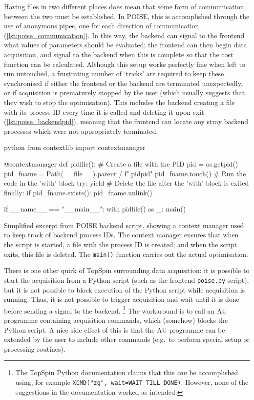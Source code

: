 Having files in two different places does mean that some form of communication between the two must be established.
In POISE, this is accomplished through the use of anonymous pipes, one for each direction of communication (\cref{lst:poise_communication}).
In this way, the backend can signal to the frontend what values of parameters should be evaluated; the frontend can then begin data acquisition, and signal to the backend when this is complete so that the cost function can be calculated.
Although this setup works perfectly fine when left to run untouched, a frustrating number of `tricks' are required to keep these synchronised if either the frontend or the backend are terminated unexpectedly, or if acquisition is prematurely stopped by the user (which usually suggests that they wish to stop the optimisation).
This includes the backend creating a file with its process ID every time it is called and deleting it upon exit (\cref{lst:poise_backendpid}), meaning that the frontend can locate any stray backend processes which were not appropriately terminated.

\begin{mylisting}[htb]
\begin{tcbminted}{python}
from contextlib import contextmanager

@contextmanager
def pidfile():
    # Create a file with the PID
    pid = os.getpid()
    pid_fname = Path(__file__).parent / f".pid{pid}"
    pid_fname.touch()
    # Run the code in the 'with' block
    try:
        yield
    # Delete the file after the 'with' block is exited
    finally:
        if pid_fname.exists():
            pid_fname.unlink()

if __name__ == "__main__":
    with pidfile() as _:
        main()
\end{tcbminted}
    \caption[Context manager to keep track of backend process IDs]{Simplified excerpt from POISE backend script, showing a context manager used to keep track of backend process IDs. The context manager ensures that when the script is started, a file with the process ID is created; and when the script exits, this file is deleted. The \texttt{main()} function carries out the actual optimisation.}
    \label{lst:poise_backendpid}
\end{mylisting}

There is one other quirk of TopSpin surrounding data acquisition: it is possible to start the acquisition from a Python script (such as the frontend \texttt{poise.py} script), but it is not possible to block execution of the Python script while acquisition is running.
Thus, it is not possible to trigger acquisition and wait until it is done before sending a signal to the backend.%
\footnote{The TopSpin Python documentation claims that this \textit{can} be accomplished using, for example \texttt{XCMD("zg", wait=WAIT\_TILL\_DONE)}. However, none of the suggestions in the documentation worked as intended.}
The workaround is to call an AU programme containing acquisition commands, which (somehow) blocks the Python script.
A nice side effect of this is that the AU programme can be extended by the user to include other commands (e.g.\ to perform special setup or processing routines).

